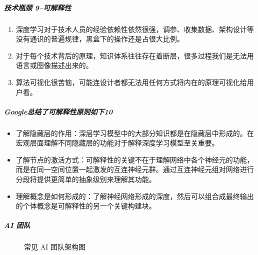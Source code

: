 \documentclass[letterpaper,11pt,english]{sphinxmanual}
\begin{document}
\subparagraph{技术瓶颈 9\sphinxfootnotemark[238]–可解释性}
\label{\detokenize{chapter_introduction/AI_PM:id13}}%
\begin{footnotetext}[238]\sphinxAtStartFootnote
{}
%
\end{footnotetext}\ignorespaces \begin{enumerate}
%
\item {} 
深度学习对于技术人员的经验依赖性依然很强，调参、收集数据、架构设计等没有通识的普遍规律，黑盒下的操作还是占很大比例。

\item {} 
对于每个技术背后的原理，知识体系往往存在着断层，很多过程我们是无法用语言或图像描述出来的。

\item {} 
算法可视化很苦恼，可能连设计者都无法用任何方式将内在的原理可视化给用户看。

\end{enumerate}


\subparagraph{Google总结了可解释性原则如下10\sphinxfootnotemark[239]}
\label{\detokenize{chapter_introduction/AI_PM:google10}}%
\begin{footnotetext}[239]\sphinxAtStartFootnote
{}
%
\end{footnotetext}\ignorespaces \begin{itemize}
\item {} 
了解隐藏层的作用：深层学习模型中的大部分知识都是在隐藏层中形成的。在宏观层面理解不同隐藏层的功能对于解释深度学习模型至关重要。

\item {} 
了解节点的激活方式：可解释性的关键不在于理解网络中各个神经元的功能，而是在同一空间位置一起激发的互连神经元群。通过互连神经元组对网络进行分段将提供更简单的抽象级别来理解其功能。

\item {} 
理解概念是如何形成的：了解神经网络形成的深度，然后可以组合成最终输出的个体概念是可解释性的另一个关键构建块。

\end{itemize}


\subparagraph{AI 团队}
\label{\detokenize{chapter_introduction/AI_PM:id14}}
\begin{figure}[H]
\centering
\capstart

\noindent{}
\caption{常见 AI 团队架构图}\label{\detokenize{chapter_introduction/AI_PM:id54}}\end{figure}
\end{document}
